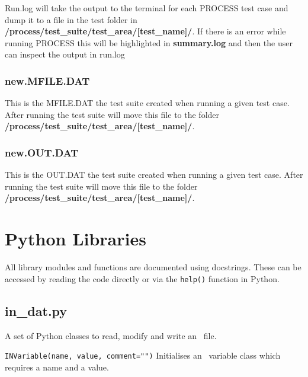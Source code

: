 Run.log will take the output to the terminal for each PROCESS test case and dump it to a file in the test folder in \textbf{/process/test\_suite/test\_area/[test\_name]/}. If there is an error while running PROCESS this will be highlighted in \textbf{summary.log} and then the user can inspect the output in run.log\\

\subsubsection*{new.MFILE.DAT}

This is the MFILE.DAT the test suite created when running a given test case. After running the test suite will move this file to the folder \textbf{/process/test\_suite/test\_area/[test\_name]/}.\\

\subsubsection*{new.OUT.DAT}

This is the OUT.DAT the test suite created when running a given test case. After running the test suite will move this file to the folder \textbf{/process/test\_suite/test\_area/[test\_name]/}.\\


\section{Python Libraries}
\label{sec:py_lib}

All library modules and functions are documented using docstrings. These can
be accessed by reading the code directly or via the \texttt{help()} function
in Python.

\subsection{in\_dat.py}

A set of Python classes to read, modify and write an \indat\ file.

\begin{description}

\item{\verb|INVariable(name, value, comment="")| } Initialises an \indat\
  variable class which requires a name and a value.

\end{description}

